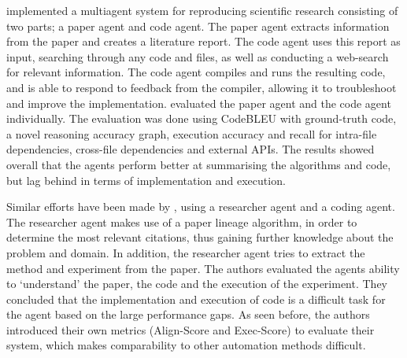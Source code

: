 \documentclass[letterpaper]{article} %
\begin{document}
\citet{xiang_scireplicate-bench_2025} implemented a multiagent system for reproducing scientific research consisting of two parts; a paper agent and code agent. The paper agent extracts information from the paper and creates a literature report. The code agent uses this report as input, searching through any code and files, as well as conducting a web-search for relevant information. The code agent compiles and runs the resulting code, and is able to respond to feedback from the compiler, allowing it to troubleshoot and improve the implementation. 
\citet{xiang_scireplicate-bench_2025} evaluated the paper agent and the code agent individually. The evaluation was done using CodeBLEU with ground-truth code, a novel reasoning accuracy graph, execution accuracy and recall for intra-file dependencies, cross-file dependencies and external APIs. The results showed overall that the agents perform better at summarising the algorithms and code, but lag behind in terms of implementation and execution.

Similar efforts have been made by \citet{zhao_autoreproduce_2025}, using a researcher agent and a coding agent. The researcher agent makes use of a paper lineage algorithm, in order to determine the most relevant citations, thus gaining further knowledge about the problem and domain. In addition, the researcher agent tries to extract the method and experiment from the paper. The authors evaluated the agents ability to `understand' the paper, the code and the execution of the experiment. They concluded that the implementation and execution of code is a difficult task for the agent based on the large performance gaps. As seen before, the authors introduced their own metrics (Align-Score and Exec-Score) to evaluate their system, which makes comparability to other automation methods difficult.
\end{document}
